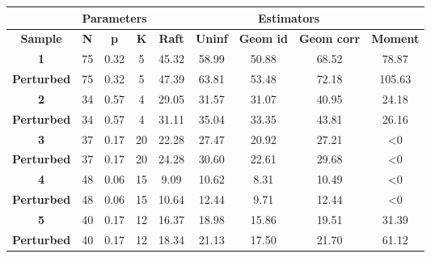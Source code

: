 \begin{table}[!ht]
    \centering
    \begin{tabular}{|c|c|c|c|c|c|c|c|c|}
        \hline
        \textbf{}          & \multicolumn{3}{c|}{\textbf{Parameters}} & \multicolumn{5}{c|}{\textbf{Estimators}}                                                 \\ \hline
        \textbf{Sample}    & \textbf{N}   & \textbf{p}  & \textbf{K}  & \textbf{Raft} & \textbf{Uninf} & \textbf{Geom id} & \textbf{Geom corr} & \textbf{Moment} \\ \hline
        \textbf{1}         & 75           & 0.32        & 5           & 45.32         & 58.99          & 50.88            & 68.52              & 78.87           \\ \hline
        \textbf{Perturbed} & 75           & 0.32        & 5           & 47.39         & 63.81          & 53.48            & 72.18              & 105.63          \\ \hline
        \textbf{2}         & 34           & 0.57        & 4           & 29.05         & 31.57          & 31.07            & 40.95              & 24.18           \\ \hline
        \textbf{Perturbed} & 34           & 0.57        & 4           & 31.11         & 35.04          & 33.35            & 43.81              & 26.16           \\ \hline
        \textbf{3}         & 37           & 0.17        & 20          & 22.28         & 27.47          & 20.92            & 27.21              & \textless 0     \\ \hline
        \textbf{Perturbed} & 37           & 0.17        & 20          & 24.28         & 30.60          & 22.61            & 29.68              & \textless{}0    \\ \hline
        \textbf{4}         & 48           & 0.06        & 15          & 9.09          & 10.62          & 8.31             & 10.49              & \textless{}0    \\ \hline
        \textbf{Perturbed} & 48           & 0.06        & 15          & 10.64         & 12.44          & 9.71             & 12.44              & \textless{}0    \\ \hline
        \textbf{5}         & 40           & 0.17        & 12          & 16.37         & 18.98          & 15.86            & 19.51              & 31.39           \\ \hline
        \textbf{Perturbed} & 40           & 0.17        & 12          & 18.34         & 21.13          & 17.50            & 21.70              & 61.12           \\ \hline

\end{tabular}
\end{table}
